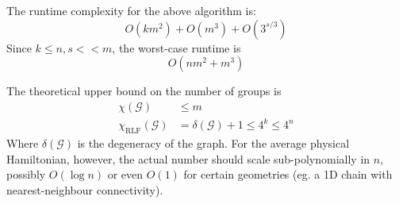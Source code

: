 \documentclass{article}
\newcommand{\genset}{\mathcal{G}}
\begin{document}
The runtime complexity for the above algorithm is:\begin{equation*}
    O(km^2) + O(m^3) + O(3^{s/3})
\end{equation*}
Since $k \le n, s << m$, the worst-case runtime is
\begin{equation}O(nm^2 + m^3)\end{equation}

The theoretical upper bound on the number of groups is \begin{align}
    \chi(\genset)&\le m\\
    \chi_{\text{RLF}}(\genset)&=\delta(\genset) + 1 \le 4^k \le 4^n
\end{align}
Where $\delta(\genset)$ is the degeneracy of the graph. For the average physical Hamiltonian, however, the actual number should scale sub-polynomially in $n$, possibly $O(\log n)$ or even $O(1)$ for certain geometries (eg. a 1D chain with nearest-neighbour connectivity).

\printbibliography
\end{document}

